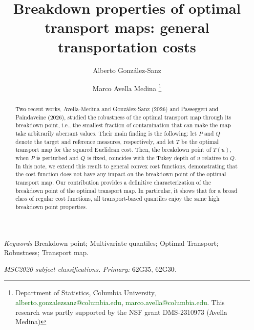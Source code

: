 \documentclass[11pt]{article}
\theoremstyle{plain}
\theoremstyle{definition}\newtheorem{definition}[theorem]{Definition}
\theoremstyle{remark}
\begin{document}
\title{ \huge Breakdown properties of optimal transport maps:  general transportation costs }
\date{}
\author{  
  Alberto Gonz{\'a}lez-Sanz
  \and Marco Avella Medina
  \thanks{Department of Statistics, Columbia University, \textcolor{darkgreen}{alberto.gonzalezsanz@columbia.edu}, \textcolor{darkgreen}{marco.avella@columbia.edu}. This research was partly
supported by the  NSF grant DMS-2310973 (Avella Medina)}   
  }
  
\maketitle 
\vspace{-1.5em}
\begin{abstract}
Two recent works, Avella-Medina and González-Sanz (2026) and Passeggeri and Painda\-veine (2026), studied the robustness of the optimal transport map through its breakdown point, i.e., the smallest fraction of contamination that can make the map take arbitrarily aberrant values. Their main finding is the following: let $P$ and $Q$ denote the target and reference measures, respectively, and let $T$ be the optimal transport map for the squared Euclidean cost. 
Then, the breakdown point of $T(u)$, when $P$ is perturbed and $Q$ is fixed, coincides with the Tukey depth of $u$ relative to $Q$. In this  note, we extend this result to general convex cost functions, demonstrating that the cost function does not have any impact on the breakdown point of the optimal transport map.    Our contribution provides a definitive characterization of the breakdown point of the optimal transport map. In particular, it shows that for a broad class of regular cost functions, all transport-based quantiles enjoy the same high breakdown point properties.  
\end{abstract}

 \vspace{1em}

{\small
\noindent \emph{Keywords} Breakdown point; Multivariate quantiles; Optimal Transport; Robustness; Transport map.

\noindent \emph{MSC2020 subject classifications. Primary: } 62G35, 62G30.  
}
 \vspace{.2em}
\end{document}
